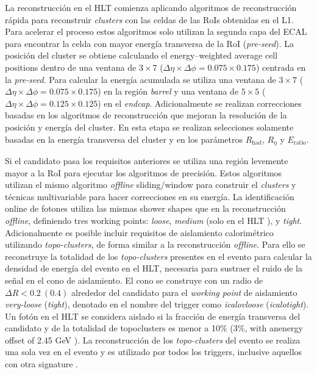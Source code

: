 La reconstrucción en el HLT comienza aplicando algoritmos de reconstrucción rápida para reconstruir \textit{clusters} con las celdas de las RoIs obtenidas en el L1. Para acelerar el proceso estos algoritmos solo utilizan la segunda capa del ECAL para encontrar la celda con mayor energía transversa de la RoI (\textit{pre-seed}). La posición del cluster se obtiene calculando el energy–weighted average cell positions  dentro de una ventana de $3\times7$ ($\Delta\eta\times\Delta\phi = 0.075\times0.175$) centrada en la \textit{pre-seed}. Para calcular la energía acumulada  se utiliza una ventana de $3\times7$ ($\Delta\eta\times\Delta\phi = 0.075\times0.175$) en la región \textit{barrel} y una ventana de $5\times5$ ($\Delta\eta\times\Delta\phi = 0.125\times0.125$) en el \textit{endcap}. Adicionalmente se realizan correcciones basadas en los algoritmos de reconstrucción que mejoran la resolución de la posición y energía del cluster. En esta etapa se realizan selecciones solamente basadas en la energía transversa del cluster y en los parámetros $R_{\text{had}}$, $R_{\eta}$ y $E_{\text{ratio}}$.


Si el candidato pasa los requisitos anteriores se utiliza una región levemente mayor a la RoI para ejecutar los algoritmos de precisión. Estos algoritmos utilizan el mismo algoritmo \textit{offline} sliding/window  \cite{Lampl:1099735} para construir el \textit{clusters} y técnicas multivariable \cite{PERF-2017-03} para hacer correcciones en su energía. La identificación online de fotones utiliza las mismas shower shapes que en la reconstrucción \textit{offline}, definiendo tres working points: \textit{loose}, \textit{medium} (solo en el HLT ), y \textit{tight}.
Adicionalmente es posible incluir requisitos de aislamiento calorimétrico utilizando \textit{topo-clusters}, de forma similar a la reconstrucción \textit{offline}. Para ello se reconstruye la totalidad de los \textit{topo-clusters} presentes en el evento para calcular la densidad de energía del evento en el HLT, necesaria para sustraer el ruido de la señal en el cono de aislamiento. El cono se construye con un radio de  $\Delta R < 0.2\:(0.4)$ alrededor del candidato para el \textit{working point} de aislamiento \textit{very-loose} (\textit{tight}), denotado en el nombre del trigger como \textit{icalovloose} (\textit{icalotight}). Un fotón en el HLT se considera aislado si la fracción de energía transversa del candidato y de la totalidad de topoclusters es menor a 10\% (3\%, with anenergy offset of 2.45 GeV ). La reconstrucción de los \textit{topo-clusters} del evento se realiza una sola vez en el evento y es utilizado por todos los triggers, inclusive aquellos con otra signature .

